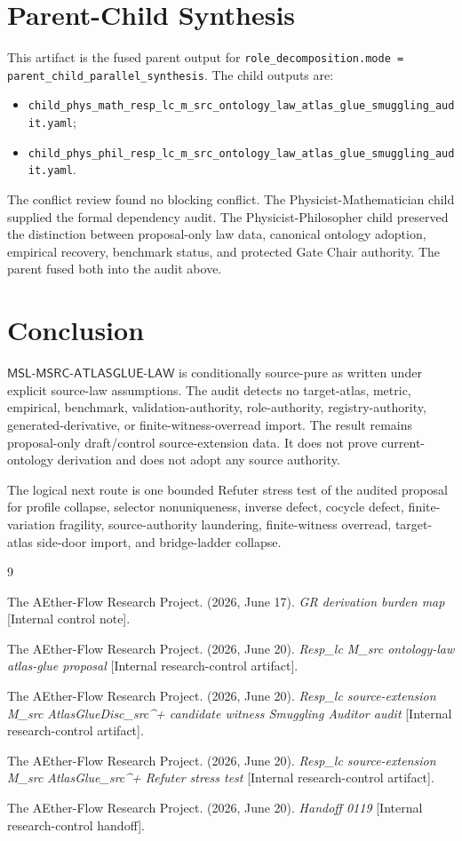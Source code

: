 \documentclass[11pt]{article}
\newcommand{\MSL}{\mathsf{MSL}\mbox{-}\mathsf{MSRC}\mbox{-}\mathsf{ATLASGLUE}\mbox{-}\mathsf{LAW}}
\begin{document}
\section{Parent-Child Synthesis}

This artifact is the fused parent output for
\texttt{role\_decomposition.mode = parent\_child\_parallel\_synthesis}. The
child outputs are:
\begin{itemize}
  \item \texttt{child\_phys\_math\_resp\_lc\_m\_src\_ontology\_law\_atlas\_glue\_smuggling\_audit.yaml};
  \item \texttt{child\_phys\_phil\_resp\_lc\_m\_src\_ontology\_law\_atlas\_glue\_smuggling\_audit.yaml}.
\end{itemize}
The conflict review found no blocking conflict. The Physicist-Mathematician
child supplied the formal dependency audit. The Physicist-Philosopher child
preserved the distinction between proposal-only law data, canonical ontology
adoption, empirical recovery, benchmark status, and protected Gate Chair
authority. The parent fused both into the audit above.

\section{Conclusion}

\(\MSL\) is conditionally source-pure as written under explicit source-law
assumptions. The audit detects no target-atlas, metric, empirical, benchmark,
validation-authority, role-authority, registry-authority, generated-derivative,
or finite-witness-overread import. The result remains proposal-only
draft/control source-extension data. It does not prove current-ontology
derivation and does not adopt any source authority.

The logical next route is one bounded Refuter stress test of the audited
proposal for profile collapse, selector nonuniqueness, inverse defect, cocycle
defect, finite-variation fragility, source-authority laundering,
finite-witness overread, target-atlas side-door import, and bridge-ladder
collapse.

\begin{thebibliography}{9}

The AEther-Flow Research Project. (2026, June 17). \emph{GR derivation burden
map} [Internal control note].

The AEther-Flow Research Project. (2026, June 20). \emph{Resp\_lc M\_src
ontology-law atlas-glue proposal} [Internal research-control artifact].

The AEther-Flow Research Project. (2026, June 20). \emph{Resp\_lc
source-extension M\_src AtlasGlueDisc\_src\^{}+ candidate witness Smuggling
Auditor audit} [Internal research-control artifact].

The AEther-Flow Research Project. (2026, June 20). \emph{Resp\_lc
source-extension M\_src AtlasGlue\_src\^{}+ Refuter stress test} [Internal
research-control artifact].

The AEther-Flow Research Project. (2026, June 20). \emph{Handoff 0119}
[Internal research-control handoff].

\end{thebibliography}
\end{document}
